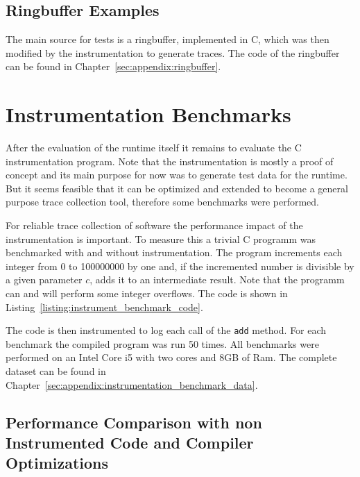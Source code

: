 \subsection{Ringbuffer Examples}

The main source for tests is a ringbuffer, implemented in C, which was then modified by the instrumentation to generate traces.
The code of the ringbuffer can be found in Chapter~\ref{sec:appendix:ringbuffer}.



\section{Instrumentation Benchmarks}
\label{sec:evaluation:instrumentation_benchmarks}

After the evaluation of the runtime itself it remains to evaluate the C instrumentation program.
Note that the instrumentation is mostly a proof of concept and its main purpose for now was to generate test data for the runtime.
But it seems feasible that it can be optimized and extended to become a general purpose trace collection tool, therefore some benchmarks were performed.

For reliable trace collection of software the performance impact of the instrumentation is important.
To measure this a trivial C programm was benchmarked with and without instrumentation.
The program increments each integer from 0 to 100000000 by one and, if the incremented number is divisible by a given parameter \(c\), adds it to an intermediate result.
Note that the programm  can and will perform some integer overflows.
The code is shown in Listing~\ref{listing:instrument_benchmark_code}.

\begin{figure}

\end{figure}

The code is then instrumented to log each call of the \lstinline{add} method.
For each benchmark the compiled program was run 50 times.
All benchmarks were performed on an Intel Core i5 with two cores and 8GB of Ram.
The complete dataset can be found in Chapter~\ref{sec:appendix:instrumentation_benchmark_data}.

\subsection{Performance Comparison with non Instrumented Code and Compiler Optimizations}
\label{sec:evaluation:instrumentation_benchmark:instr_vs_non_inst}

